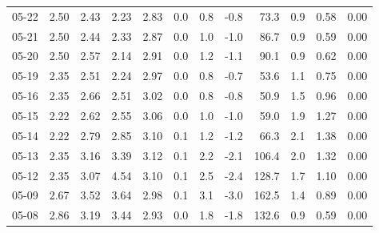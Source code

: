 \begin{threeparttable}
{\begin{tabular}{lrrrrrrrrrrr}
  05-22 &          2.50 &          2.43 &          2.23 &        2.83 &                 0.0 &                 0.8 &       -0.8 &                73.3 &              0.9 &            0.58 &                   0.00 \\
  05-21 &          2.50 &          2.44 &          2.33 &        2.87 &                 0.0 &                 1.0 &       -1.0 &                86.7 &              0.9 &            0.59 &                   0.00 \\
  05-20 &          2.50 &          2.57 &          2.14 &        2.91 &                 0.0 &                 1.2 &       -1.1 &                90.1 &              0.9 &            0.62 &                   0.00 \\
  05-19 &          2.35 &          2.51 &          2.24 &        2.97 &                 0.0 &                 0.8 &       -0.7 &                53.6 &              1.1 &            0.75 &                   0.00 \\
  05-16 &          2.35 &          2.66 &          2.51 &        3.02 &                 0.0 &                 0.8 &       -0.8 &                50.9 &              1.5 &            0.96 &                   0.00 \\
  05-15 &          2.22 &          2.62 &          2.55 &        3.06 &                 0.0 &                 1.0 &       -1.0 &                59.0 &              1.9 &            1.27 &                   0.00 \\
  05-14 &          2.22 &          2.79 &          2.85 &        3.10 &                 0.1 &                 1.2 &       -1.2 &                66.3 &              2.1 &            1.38 &                   0.00 \\
  05-13 &          2.35 &          3.16 &          3.39 &        3.12 &                 0.1 &                 2.2 &       -2.1 &               106.4 &              2.0 &            1.32 &                   0.00 \\
  05-12 &          2.35 &          3.07 &          4.54 &        3.10 &                 0.1 &                 2.5 &       -2.4 &               128.7 &              1.7 &            1.10 &                   0.00 \\
  05-09 &          2.67 &          3.52 &          3.64 &        2.98 &                 0.1 &                 3.1 &       -3.0 &               162.5 &              1.4 &            0.89 &                   0.00 \\
  05-08 &          2.86 &          3.19 &          3.44 &        2.93 &                 0.0 &                 1.8 &       -1.8 &               132.6 &              0.9 &            0.59 &                   0.00 \\

\end{tabular}}
\end{threeparttable}
